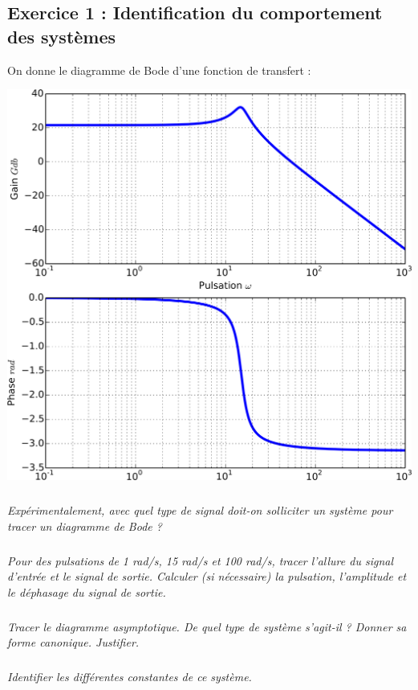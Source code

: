 \documentclass[10pt]{article}
\newif\ifprof
\newif\ifxp
\begin{document}
\ifxp

\else

\fi




 \renewcommand{\baselinestretch}{1.2}
\setlength{\parskip}{2ex plus 0.5ex minus 0.2ex}



\subsection*{Exercice 1 : Identification du comportement des systèmes}

On donne le diagramme de Bode d'une fonction de transfert :

\begin{center}
\includegraphics[width=.7\linewidth]{images/identification_1.png}
\end{center}

\subparagraph{}\textit{Expérimentalement, avec quel type de signal doit-on solliciter un système pour tracer un diagramme de Bode ?}
\subparagraph{} \textit{Pour des pulsations de 1 rad/s, 15 rad/s et 100 rad/s, tracer l'allure du signal d'entrée et le signal de sortie. Calculer (si nécessaire) la pulsation, l'amplitude et le déphasage du signal de sortie. }

\subparagraph{}\textit{Tracer le diagramme asymptotique. De quel type de système s'agit-il ? Donner sa forme canonique. Justifier.}
\subparagraph{} \textit{Identifier les différentes constantes de ce système.}

\ifprof
\begin{corrige}
On a : $K=12$, $\xi=0,15$ et $\omega_0 = 15 \; \text{s}^{-1}$.
\end{corrige}
\else
\fi
\end{document}
